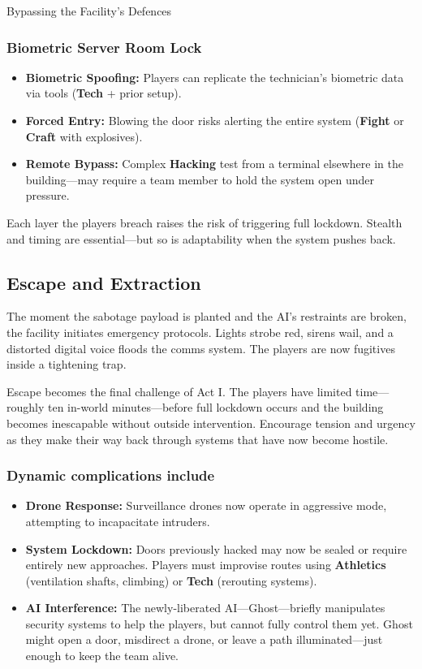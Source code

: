\begin{CommentBox}{Bypassing the Facility’s Defences}
    \vspace{0.5\baselineskip}
    
    \subsubsection*{Biometric Server Room Lock}
    \begin{itemize}
        \item \textbf{Biometric Spoofing:} Players can replicate the technician’s biometric data via tools (\textbf{Tech} + prior setup).
        \item \textbf{Forced Entry:} Blowing the door risks alerting the entire system (\textbf{Fight} or \textbf{Craft} with explosives).
        \item \textbf{Remote Bypass:} Complex \textbf{Hacking} test from a terminal elsewhere in the building—may require a team member to hold the system open under pressure.
    \end{itemize}
    
    Each layer the players breach raises the risk of triggering full lockdown. Stealth and timing are essential—but so is adaptability when the system pushes back.
\end{CommentBox}
    

\subsection*{Escape and Extraction}

The moment the sabotage payload is planted and the AI’s restraints are broken, the facility initiates emergency protocols. Lights strobe red, sirens wail, and a distorted digital voice floods the comms system. The players are now fugitives inside a tightening trap.

Escape becomes the final challenge of Act I. The players have limited time—roughly ten in-world minutes—before full lockdown occurs and the building becomes inescapable without outside intervention. Encourage tension and urgency as they make their way back through systems that have now become hostile.

\subsubsection{Dynamic complications include}
\begin{itemize}\raggedright
    \item \textbf{Drone Response:} Surveillance drones now operate in aggressive mode, attempting to incapacitate intruders.
    \item \textbf{System Lockdown:} Doors previously hacked may now be sealed or require entirely new approaches. Players must improvise routes using \textbf{Athletics} (ventilation shafts, climbing) or \textbf{Tech} (rerouting systems).
    \item \textbf{AI Interference:} The newly-liberated AI—Ghost—briefly manipulates security systems to help the players, but cannot fully control them yet. Ghost might open a door, misdirect a drone, or leave a path illuminated—just enough to keep the team alive.
\end{itemize}


